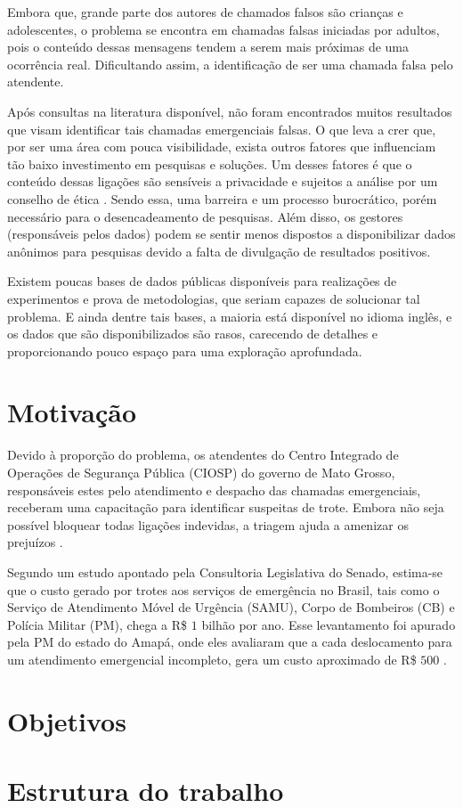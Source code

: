 Embora que, grande parte dos autores de chamados falsos são crianças e adolescentes, o problema se encontra em chamadas falsas iniciadas por adultos, pois o conteúdo dessas mensagens tendem a serem mais próximas de uma ocorrência real. Dificultando assim, a identificação de ser uma chamada falsa pelo atendente.

Após consultas na literatura disponível, não foram encontrados muitos resultados que visam identificar tais chamadas emergenciais falsas. O que leva a crer que, por ser uma área com pouca visibilidade, exista outros fatores que influenciam tão baixo investimento em pesquisas e soluções. Um desses fatores é que o conteúdo dessas ligações são sensíveis a privacidade e sujeitos a análise por um conselho de ética \citep{francisconi1998aspectos}. Sendo essa, uma barreira e um processo burocrático, porém necessário para o desencadeamento de pesquisas. Além disso, os gestores (responsáveis pelos dados) podem se sentir menos dispostos a disponibilizar dados anônimos para pesquisas devido a falta de divulgação de resultados positivos.

Existem poucas bases de dados públicas disponíveis para realizações de experimentos e prova de metodologias, que seriam capazes de solucionar tal problema. E ainda dentre tais bases, a maioria está disponível no idioma inglês, e os dados que são disponibilizados são rasos, carecendo de detalhes e proporcionando pouco espaço para uma exploração aprofundada.

\section{Motivação}
Devido à proporção do problema, os atendentes do Centro Integrado de Operações de Segurança Pública (CIOSP) do governo de Mato Grosso, responsáveis estes pelo atendimento e despacho das chamadas emergenciais, receberam uma capacitação para identificar suspeitas de trote. Embora não seja possível bloquear todas ligações indevidas, a triagem ajuda a amenizar os prejuízos \citep{govMatoGrosso2016}.

Segundo um estudo apontado pela Consultoria Legislativa do Senado, estima-se que o custo gerado por trotes aos serviços de emergência no Brasil, tais como o Serviço de Atendimento Móvel de Urgência (SAMU), Corpo de Bombeiros (CB) e Polícia Militar (PM), chega a R\$ $1$ bilhão por ano. Esse levantamento foi apurado pela PM do estado do Amapá, onde eles avaliaram que a cada deslocamento para um atendimento emergencial incompleto, gera um custo aproximado de R\$ $500$ \citep{globo2014trotes, peixoto2015combate}.

\section{Objetivos}

\section{Estrutura do trabalho}

